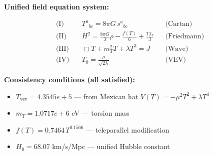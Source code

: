 
\textbf{Unified field equation system:}

\begin{align}
  \text{(I)} \quad & T^a{}_{bc} = 8\pi G \, s^a{}_{bc} && \text{(Cartan)} \\
  \text{(II)} \quad & H^2 = \frac{8\pi G}{3}\rho - \frac{f(T)}{6} + \frac{Tf_T}{3} && \text{(Friedmann)} \\
  \text{(III)} \quad & \Box T + m_T^2 T + \lambda T^3 = J && \text{(Wave)} \\
  \text{(IV)} \quad & T_0 = \frac{\mu}{\sqrt{2\lambda}} && \text{(VEV)}
\end{align}

\textbf{Consistency conditions (all satisfied):}
\begin{itemize}
  \item $T_{\text{vev}} = 4.3545e+5$ — from Mexican hat $V(T) = -\mu^2 T^2 + \lambda T^4$
  \item $m_T = 1.0717e+6$ eV — torsion mass
  \item $f(T) = 0.7464 \, T^{0.1566}$ — teleparallel modification
  \item $H_0 = 68.07$ km/s/Mpc — unified Hubble constant
\end{itemize}